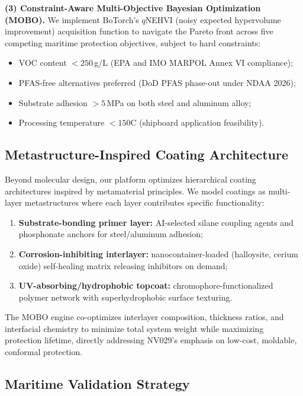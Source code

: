 \documentclass[11pt,letterpaper]{article}
\begin{document}
\textbf{(3) Constraint-Aware Multi-Objective Bayesian Optimization (MOBO).}
We implement BoTorch's $q$NEHVI (noisy expected hypervolume improvement)
acquisition function to navigate the Pareto front across five competing
maritime protection objectives, subject to hard constraints:
\begin{itemize}[nosep]
  \item VOC content $< 250$\,g/L (EPA and IMO MARPOL Annex VI compliance);
  \item PFAS-free alternatives preferred (DoD PFAS phase-out under NDAA 2026);
  \item Substrate adhesion $> 5$\,MPa on both steel and aluminum alloy;
  \item Processing temperature $< 150$\textdegree C (shipboard application
    feasibility).
\end{itemize}

\subsection{Metastructure-Inspired Coating Architecture}

Beyond molecular design, our platform optimizes hierarchical coating
architectures inspired by metamaterial principles. We model coatings as
multi-layer metastructures where each layer contributes specific functionality:
\begin{enumerate}[nosep]
  \item \textbf{Substrate-bonding primer layer:} AI-selected silane coupling
    agents and phosphonate anchors for steel/aluminum adhesion;
  \item \textbf{Corrosion-inhibiting interlayer:} nanocontainer-loaded
    (halloysite, cerium oxide) self-healing matrix releasing inhibitors on demand;
  \item \textbf{UV-absorbing/hydrophobic topcoat:} chromophore-functionalized
    polymer network with superhydrophobic surface texturing.
\end{enumerate}
The MOBO engine co-optimizes interlayer composition, thickness ratios, and
interfacial chemistry to minimize total system weight while maximizing
protection lifetime, directly addressing NV029's emphasis on low-cost,
moldable, conformal protection.

\subsection{Maritime Validation Strategy}
\end{document}
